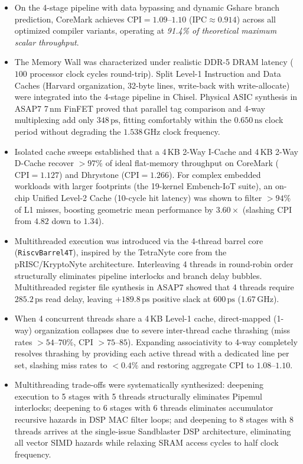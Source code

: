 \begin{itemize}
    \item On the 4-stage pipeline with data bypassing and dynamic Gshare branch prediction, CoreMark achieves $\text{CPI} = 1.09\text{--}1.10$ ($\text{IPC} \approx 0.914$) across all optimized compiler variants, operating at \textit{91.4\% of theoretical maximum scalar throughput}.
    \item The Memory Wall was characterized under realistic DDR-5 DRAM latency ($100$ processor clock cycles round-trip). Split Level-1 Instruction and Data Caches (Harvard organization, 32-byte lines, write-back with write-allocate) were integrated into the 4-stage pipeline in Chisel. Physical ASIC synthesis in ASAP7 7\,nm FinFET proved that parallel tag comparison and 4-way multiplexing add only $348\,\text{ps}$, fitting comfortably within the $0.650\,\text{ns}$ clock period without degrading the $1.538\,\text{GHz}$ clock frequency.
    \item Isolated cache sweeps established that a 4\,KB 2-Way I-Cache and 4\,KB 2-Way D-Cache recover $>97\%$ of ideal flat-memory throughput on CoreMark ($\text{CPI} = 1.127$) and Dhrystone ($\text{CPI} = 1.266$). For complex embedded workloads with larger footprints (the 19-kernel Embench-IoT suite), an on-chip Unified Level-2 Cache (10-cycle hit latency) was shown to filter $>94\%$ of L1 misses, boosting geometric mean performance by $3.60\times$ (slashing CPI from $4.82$ down to $1.34$).
    \item Multithreaded execution was introduced via the 4-thread barrel core (\texttt{RiscvBarrel4T}), inspired by the TetraNyte core from the pRISC/KryptoNyte architecture. Interleaving 4 threads in round-robin order structurally eliminates pipeline interlocks and branch delay bubbles. Multithreaded register file synthesis in ASAP7 showed that 4 threads require $285.2\,\text{ps}$ read delay, leaving $+189.8\,\text{ps}$ positive slack at $600\,\text{ps}$ ($1.67\,\text{GHz}$).
    \item When 4 concurrent threads share a 4\,KB Level-1 cache, direct-mapped (1-way) organization collapses due to severe inter-thread cache thrashing (miss rates $>54\text{--}70\%$, CPI $>75\text{--}85$). Expanding associativity to 4-way completely resolves thrashing by providing each active thread with a dedicated line per set, slashing miss rates to $<0.4\%$ and restoring aggregate CPI to $1.08\text{--}1.10$.
    \item Multithreading trade-offs were systematically synthesized: deepening execution to 5 stages with 5 threads structurally eliminates Pipemul interlocks; deepening to 6 stages with 6 threads eliminates accumulator recursive hazards in DSP MAC filter loops; and deepening to 8 stages with 8 threads arrives at the single-issue Sandblaster DSP architecture, eliminating all vector SIMD hazards while relaxing SRAM access cycles to half clock frequency.

\end{itemize}
